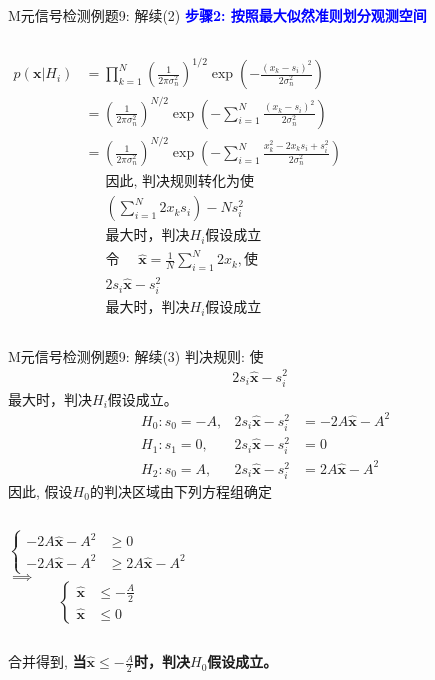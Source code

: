 \begin{frame}[shrink]{M元信号检测例题9: 解续(2)}
\textbf{\textcolor{blue}{步骤2: 按照最大似然准则划分观测空间}}
\begin{columns}[T]
	\begin{align*}
	p(\bm{x}|H_i)&=\prod_{k=1}^{N}\left(\frac{1}{2\pi\sigma_n^2}\right)^{1/2}\exp\left(-\frac{(x_k-s_i)^2}{2\sigma_n^2}\right)\\
	&=\left(\frac{1}{2\pi\sigma_n^2}\right)^{N/2}\exp\left(-\sum_{i=1}^{N}\frac{(x_k-s_i)^2}{2\sigma_n^2}\right)\\
	&=\left(\frac{1}{2\pi\sigma_n^2}\right)^{N/2}\exp\left(-\sum_{i=1}^{N}\frac{x_k^2-2x_ks_i+s_i^2}{2\sigma_n^2}\right)
	\end{align*}
	\begin{align*}
	&\text{因此, 判决规则转化为使}\\
	&\left(\sum_{i=1}^{N}2x_ks_i\right)-Ns_i^2\\
    &\text{最大时，判决$H_i$假设成立}\\
	&\text{令 }\quad \bm{\hat{x}}=\frac{1}{N}\sum_{i=1}^{N}2x_k, \text{使}\\
	&2s_i\bm{\hat{x}}-s_i^2\\
	&\text{最大时，判决$H_i$假设成立}
	\end{align*}
\end{columns}
\end{frame}

\begin{frame}[shrink]{M元信号检测例题9: 解续(3)}
判决规则: 使
\begin{align*}
2s_i\bm{\hat{x}}-s_i^2
\end{align*}
最大时，判决$H_i$假设成立。
\begin{align*}
&H_0: s_0=-A, &2s_i\bm{\hat{x}}-s_i^2&=-2A\bm{\hat{x}}-A^2\\
&H_1: s_1=0, &2s_i\bm{\hat{x}}-s_i^2&=0\\
&H_2: s_0=A, &2s_i\bm{\hat{x}}-s_i^2&=2A\bm{\hat{x}}-A^2
\end{align*}
因此, 假设$H_0$的判决区域由下列方程组确定
\begin{columns}
	$$
	\begin{cases}
	-2A\bm{\hat{x}}-A^2 &\ge 0\\
	-2A\bm{\hat{x}}-A^2 &\ge 2A\bm{\hat{x}}-A^2
	\end{cases}
	$$
	$\implies$
	$$
	\begin{cases}
	\bm{\hat{x}}&\le -\frac{A}{2}\\
	\bm{\hat{x}}&\le 0
	\end{cases}
	$$
\end{columns}
合并得到, \textbf{当$\bm{\hat{x}}\le -\frac{A}{2}$时，判决$H_0$假设成立。}
\end{frame}

